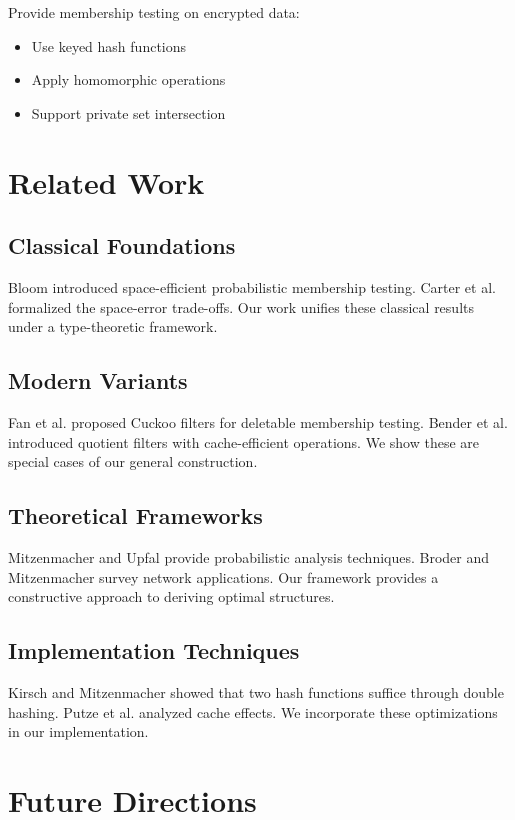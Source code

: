 \documentclass[11pt]{article}
\begin{document}
Provide membership testing on encrypted data:
\begin{itemize}
\item Use keyed hash functions
\item Apply homomorphic operations
\item Support private set intersection
\end{itemize}

\section{Related Work}

\subsection{Classical Foundations}
Bloom \cite{bloom1970} introduced space-efficient probabilistic membership testing. Carter et al. \cite{carter1978} formalized the space-error trade-offs. Our work unifies these classical results under a type-theoretic framework.

\subsection{Modern Variants}
Fan et al. \cite{fan2014} proposed Cuckoo filters for deletable membership testing. Bender et al. \cite{bender2012} introduced quotient filters with cache-efficient operations. We show these are special cases of our general construction.

\subsection{Theoretical Frameworks}
Mitzenmacher and Upfal \cite{mitzenmacher2005} provide probabilistic analysis techniques. Broder and Mitzenmacher \cite{broder2004} survey network applications. Our framework provides a constructive approach to deriving optimal structures.

\subsection{Implementation Techniques}
Kirsch and Mitzenmacher \cite{kirsch2008} showed that two hash functions suffice through double hashing. Putze et al. \cite{putze2009} analyzed cache effects. We incorporate these optimizations in our implementation.

\section{Future Directions}
\end{document}
